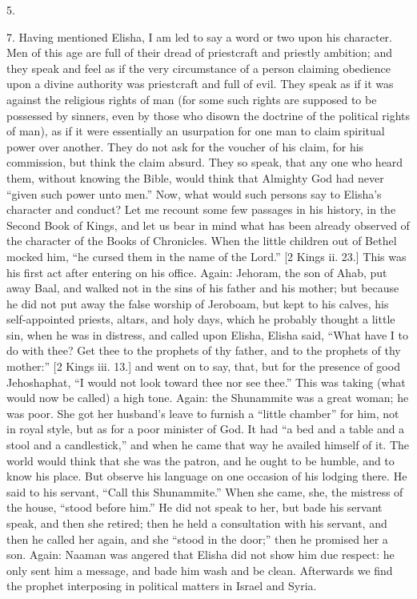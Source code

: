 5.

7. Having mentioned Elisha, I am led to say a word or two upon his
character. Men of this age are full of their dread of priestcraft and
priestly ambition; and they speak and feel as if the very circumstance
of a person claiming obedience upon a divine authority was priestcraft
and full of evil. They speak as if it was against the religious rights
of man (for some such rights are supposed to be possessed by sinners,
even by those who disown the doctrine of the political rights of man),
as if it were essentially an usurpation for one man to claim spiritual
power over another. They do not ask for the voucher of his claim, for
his commission, but think the claim absurd. They so speak, that any
one who heard them, without knowing the Bible, would think that
Almighty God had never ``given such power unto men.'' Now,
what would such persons say to Elisha's character and conduct? Let me
recount some few passages in his history, in the Second Book of Kings,
and let us bear in mind what has been already observed of the
character of the Books of Chronicles. When the little children out of
Bethel mocked him, ``he cursed them in the name of the Lord.''
[2 Kings ii. 23.] This was his first act after entering on his office.
Again: Jehoram, the son of Ahab, put away Baal, and walked not in the
sins of his father and his mother; but because he did not put away
the false worship of Jeroboam, but kept to his calves, his
self-appointed priests, altars, and holy days, which he probably
thought a little sin, when he was in distress, and called upon Elisha,
Elisha said, ``What have I to do with thee? Get thee to the
prophets of thy father, and to the prophets of thy mother:'' [2
Kings iii. 13.] and went on to say, that, but for the presence of good
Jehoshaphat, ``I would not look toward thee nor see thee.''
This was taking (what would now be called) a high tone. Again: the
Shunammite was a great woman; he was poor. She got her husband's leave
to furnish a ``little chamber'' for him, not in royal style,
but as for a poor minister of God. It had ``a bed and a table and
a stool and a candlestick,'' and when he came that way he availed
himself of it. The world would think that she was the patron, and he
ought to be humble, and to know his place. But observe his language on
one occasion of his lodging there. He said to his servant, ``Call
this Shunammite.'' When she came, she, the mistress of the house,
``stood before him.'' He did not speak to her, but bade his
servant speak, and then she retired; then he held a consultation with
his servant, and then he called her again, and she ``stood in the
door;'' then he promised her a son. Again: Naaman was angered that
Elisha did not show him due respect: he only sent him a message, and
bade him wash and be clean. Afterwards we find the prophet interposing
in political matters in Israel and Syria.


